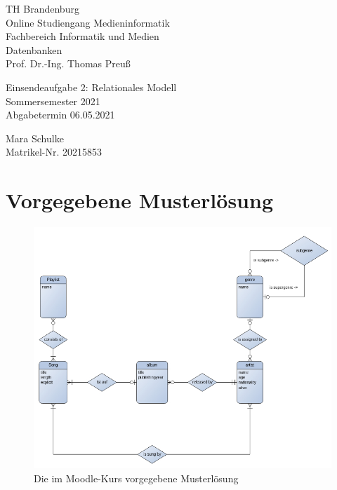\documentclass{article}
\begin{document}
\begin{titlepage}
	\begin{flushleft}
		TH Brandenburg \\
		Online Studiengang Medieninformatik \\
		Fachbereich Informatik und Medien \\
		Datenbanken \\
		Prof. Dr.-Ing. Thomas Preuß
	\end{flushleft}

	\vfill

	\begin{center}
		\Large{Einsendeaufgabe 2: Relationales Modell}\\[0.5em]
		\large{Sommersemester 2021}\\[0.25em]
		\large{Abgabetermin 06.05.2021}
	\end{center}

	\vfill

	\begin{flushright}
		Mara Schulke \\
		Matrikel-Nr. 20215853
	\end{flushright}
\end{titlepage}

\newpage

\section{Vorgegebene Musterlösung}

\begin{figure}[h!]
	\includegraphics[width=\textwidth]{er.jpg}
	\centering
	\caption{Die im Moodle-Kurs vorgegebene Musterlösung}
\end{figure}
\end{document}
